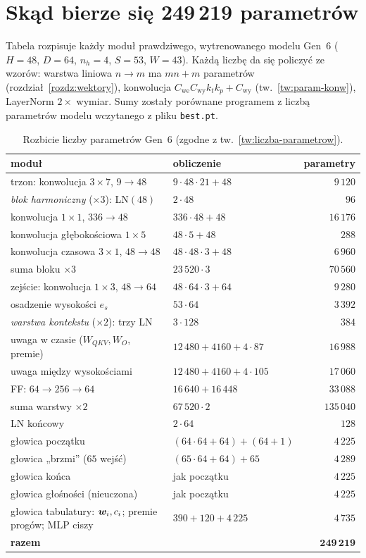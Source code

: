 \chapter{Skąd bierze się 249\,219 parametrów}\label{dod:parametry}

Tabela rozpisuje każdy moduł prawdziwego, wytrenowanego modelu Gen~6 ($H=48$, $D=64$, $n_h=4$, $S=53$, $W=43$). Każdą liczbę da się policzyć ze wzorów: warstwa liniowa $n\to m$ ma $mn+m$ parametrów (rozdział~\ref{rozdz:wektory}),
konwolucja $C_\mathrm{we}C_\mathrm{wy}k_tk_p+C_\mathrm{wy}$ (tw.~\ref{tw:param-konw}), LayerNorm $2\times$ wymiar. Sumy zostały porównane programem z liczbą parametrów modelu wczytanego z pliku \texttt{best.pt}.

\begin{table}[ht]
\centering\small
\begin{tabular}{@{}p{5.4cm}p{3.7cm}r@{}}
\toprule
moduł & obliczenie & parametry\\
\midrule
trzon: konwolucja $3{\times}7$, $9\to48$ & $9\cdot48\cdot21+48$ & $9\,120$\\
\emph{blok harmoniczny} ($\times3$): LN$(48)$ & $2\cdot48$ & $96$\\
\quad konwolucja $1{\times}1$, $336\to48$ & $336\cdot48+48$ & $16\,176$\\
\quad konwolucja głębokościowa $1{\times}5$ & $48\cdot5+48$ & $288$\\
\quad konwolucja czasowa $3{\times}1$, $48\to48$ & $48\cdot48\cdot3+48$ & $6\,960$\\
\quad suma bloku $\times3$ & $23\,520\cdot3$ & $70\,560$\\
zejście: konwolucja $1{\times}3$, $48\to64$ & $48\cdot64\cdot3+64$ & $9\,280$\\
osadzenie wysokości $e_s$ & $53\cdot64$ & $3\,392$\\
\emph{warstwa kontekstu} ($\times2$): trzy LN & $3\cdot128$ & $384$\\
\quad uwaga w czasie ($W_{QKV},W_O$, premie) & $12\,480+4160+4\cdot87$ & $16\,988$\\
\quad uwaga między wysokościami & $12\,480+4160+4\cdot105$ & $17\,060$\\
\quad FF: $64\to256\to64$ & $16\,640+16\,448$ & $33\,088$\\
\quad suma warstwy $\times2$ & $67\,520\cdot2$ & $135\,040$\\
LN końcowy & $2\cdot64$ & $128$\\
głowica początku & $(64\cdot64+64)+(64+1)$ & $4\,225$\\
głowica „brzmi” ($65$ wejść) & $(65\cdot64+64)+65$ & $4\,289$\\
głowica końca & jak początku & $4\,225$\\
głowica głośności (nieuczona) & jak początku & $4\,225$\\
głowica tabulatury: $\bm{w}_i,c_i$; premie progów; MLP ciszy & $390+120+4\,225$ & $4\,735$\\
\midrule
\textbf{razem} & & $\mathbf{249\,219}$\\
\bottomrule
\end{tabular}
\caption{Rozbicie liczby parametrów Gen~6 (zgodne z tw.~\ref{tw:liczba-parametrow}).}
\label{tab:parametry-pelne}
\end{table}

